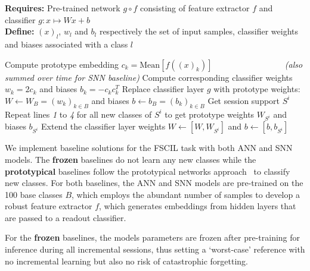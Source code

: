 \begin{center}
\begin{minipage}{.9\linewidth}
\begin{algorithm}[H]
\caption{Few-Shot Class-Incremental Learning with Prototypes}
\label{alg:prototypical_continual_learning}
\textbf{Requires:} Pre-trained network $g \circ f$ consisting of feature extractor $f$ and classifier $g: x 	\mapsto Wx+b$ \\
\textbf{Define:} $(x)_l$, $w_l$ and $b_l$ respectively the set of input samples, classifier weights and biases associated with a class $l$
\begin{algorithmic}[1]
\State Compute prototype embedding $c_k = \text{Mean}[f((x)_k)]$ ~~~~~~~~~~~~~~~~ \textit{(also summed over time for SNN baseline)}
\State Compute corresponding classifier weights $w_k = 2c_k$ and biases $b_k = - c_kc_k^T$
\EndFor
\State Replace classifier layer $g$ with prototype weights: $W \leftarrow W_{B} = (w_k)_{k \in B}$ and biases $b \leftarrow b_{B} = (b_k)_{k \in B}$
    \State Get session support $S^i$
    \State Repeat lines \textit{1} to \textit{4} for all new classes of $S^i$ to get prototype weights $W_{S^i}$ and biases $b_{S^i}$
    \State Extend the classifier layer weights $W \leftarrow [W, W_{S^i}]$ and $b \leftarrow [b, b_{S^i}]$
\EndFor
\end{algorithmic}
\end{algorithm}
\end{minipage}
\end{center}

We implement baseline solutions for the FSCIL task with both ANN and SNN models. The \textbf{frozen} baselines do not learn any new classes while the \textbf{prototypical} baselines follow the prototypical networks approach~\cite{snell2017prototypical} to classify new classes. For both baselines, the ANN and SNN models are pre-trained on the 100 base classes $B$, which employs the abundant number of samples to develop a robust feature extractor $f$, which generates embeddings from hidden layers that are passed to a readout classifier.

For the \textbf{frozen} baselines, the models parameters are frozen after pre-training for inference during all incremental sessions, thus setting a `worst-case' reference with no incremental learning but also no risk of catastrophic forgetting.

